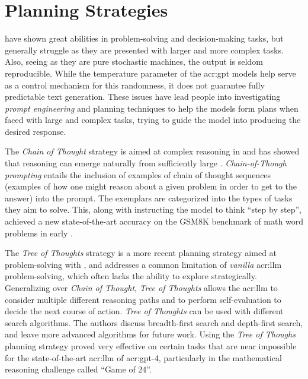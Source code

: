 \section{Planning Strategies}\label{sec:planning-strategies}

 have shown great abilities in problem-solving and decision-making tasks, but generally struggle as they are presented with larger and more complex tasks. Also, seeing as they are pure stochastic machines, the output is seldom reproducible. While the temperature parameter of the \acrshort{acr:gpt} models help serve as a control mechanism for this randomness, it does not guarantee fully predictable text generation. These issues have lead people into investigating \textit{prompt engineering} and planning techniques to help the models form plans when faced with large and complex tasks, trying to guide the model into producing the desired response.

The \textit{Chain of Thought} strategy \citep{weiChainofThoughtPromptingElicits2023} is aimed at complex reasoning in  and has showed that reasoning can emerge naturally from sufficiently large .  \textit{Chain-of-Though prompting} entails the inclusion of examples of chain of thought sequences (examples of how one might reason about a given problem in order to get to the answer) into the prompt. The exemplars are categorized into the types of tasks they aim to solve. This, along with instructing the model to think \enquote{step by step}, achieved a new state-of-the-art accuracy on the GSM8K benchmark of math word problems in early \citeyear{weiChainofThoughtPromptingElicits2023}.

The \textit{Tree of Thoughts} strategy \citep{yaoTreeThoughtsDeliberate2023} is a more recent planning strategy aimed at problem-solving with , and addresses a common limitation of \textit{vanilla} \acrshort{acr:llm} problem-solving, which often lacks the ability to explore strategically. Generalizing over \textit{Chain of Thought}, \textit{Tree of Thoughts} allows the \acrshort{acr:llm} to consider multiple different reasoning paths and to perform self-evaluation to decide the next course of action. \textit{Tree of Thoughts} can be used with different search algorithms. The authors discuss breadth-first search and depth-first search, and leave more advanced algorithms for future work. Using the \textit{Tree  of Thoughs} planning strategy proved very effective on certain tasks that are near impossible for the state-of-the-art \acrshort{acr:llm} of \acrshort{acr:gpt}-4, particularly in the mathematical reasoning challenge called \enquote{Game of 24}.

